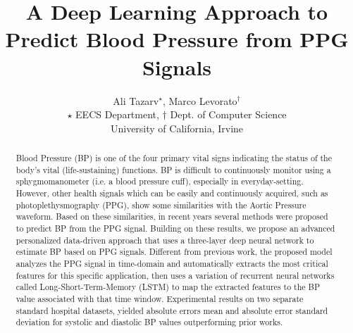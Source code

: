 \documentclass[letterpaper, 10 pt, conference]{ieeeconf}
\title{A Deep Learning Approach to Predict Blood Pressure from PPG Signals}
\author{Ali Tazarv$^{\star}$, Marco Levorato$^{\dagger}$\\
${\star}$ EECS Department, ${\dagger}$ Dept. of Computer Science\\
University of California, Irvine
\vspace{-3ex}}
\begin{document}
\maketitle

\thispagestyle{empty}
\pagestyle{empty}

\begin{abstract}
Blood Pressure (BP) is one of the four primary vital signs indicating the status of the body's vital (life-sustaining) functions. BP is difficult to continuously monitor using a sphygmomanometer (i.e. a blood pressure cuff), especially in everyday-setting. However, other health signals which can be easily and continuously acquired, such as photoplethysmography (PPG), show some similarities with the Aortic Pressure waveform. Based on these similarities, in recent years several methods were proposed to predict BP from the PPG signal. Building on these results, we propose an advanced personalized data-driven approach that uses a three-layer deep neural network to estimate BP based on PPG signals. Different from previous work, the proposed model analyzes the PPG signal in time-domain and automatically extracts the most critical features for this specific application, then uses a variation of recurrent neural networks called Long-Short-Term-Memory (LSTM) to map the extracted features to the BP value associated with that time window. Experimental results on two separate standard hospital datasets, yielded absolute errors mean and absolute error standard deviation for systolic and diastolic BP values outperforming prior works.
\end{abstract}


\end{document}
